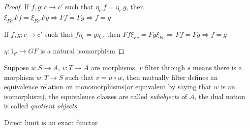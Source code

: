 \documentclass[main]{subfiles}
\begin{document}
\begin{proof}
If $f,g:c\to c'$ such that $\eta_{c'}f=\eta_{c'}g$, then $\xi_{Fc'}Ff=\xi_{Fc'}Fg\Rightarrow Ff=Fg\Rightarrow f=g$ \par
If $f,g:c\to c'$ such that $f\eta_{c}=g\eta_{c}$, then $Ff\xi_{Fc}=Fg\xi_{Fc}\Rightarrow Ff=Fg\Rightarrow f=g$
\begin{center}
\end{center}
$\eta:1_{\mathscr C}\to GF$ is a natural isomorphism
\end{proof}

\begin{definition}
Suppose $u:S\to A$, $v:T\to A$ are morphisms, $v$ filter through $s$ means there is a morphism $w:T\to S$ such that $v=u\circ w$, then mutually filter defines an equivalence relation on monomorphisms(or equivalent by saying that $w$ is an isomorphism), the equivalence classes are called \textit{subobjects} of $A$, the dual notion is called \textit{quotient objects}
\end{definition}

\begin{proposition}
Direct limit is an exact functor
\end{proposition}
\end{document}
